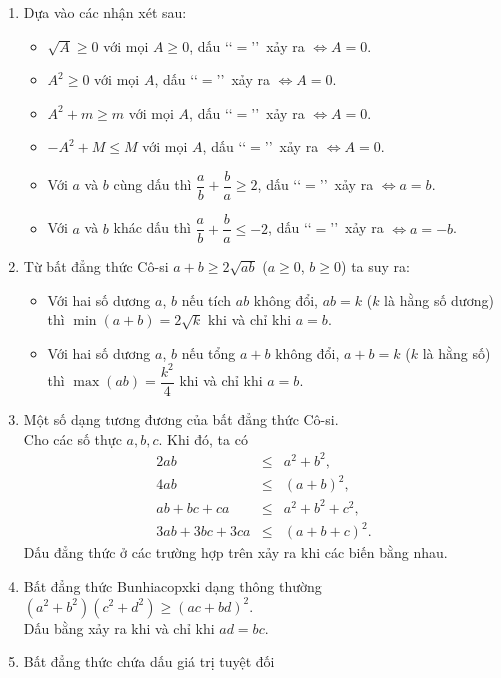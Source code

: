 \begin{enumerate}
	\item Dựa vào các nhận xét sau:
	\begin{itemize}
		\item $\sqrt{A}\geq 0$ với mọi $A\geq 0$,  dấu \lq\lq$=$\rq\rq\ xảy ra $\Leftrightarrow A=0$.
		\item $A^2\geq 0$ với mọi $A$, dấu \lq\lq$=$\rq\rq\ xảy ra $\Leftrightarrow A=0$.
		\item $A^2+m\geq m$ với mọi $A$, dấu \lq\lq$=$\rq\rq\ xảy ra $\Leftrightarrow A=0$. 
		\item $-A^2+M\leq M$ với mọi $A$, dấu \lq\lq$=$\rq\rq\ xảy ra $\Leftrightarrow A=0$.
		\item Với $a$ và $b$ cùng dấu thì $\dfrac{a}{b}+\dfrac{b}{a}\geq 2$, dấu \lq\lq$=$\rq\rq\ xảy ra $\Leftrightarrow a=b$. 
		\item Với $a$ và $b$ khác dấu thì $\dfrac{a}{b}+\dfrac{b}{a}\leq -2$, dấu \lq\lq$=$\rq\rq\ xảy ra $\Leftrightarrow a=-b$.
	\end{itemize}
	\item Từ bất đẳng thức Cô-si $a+b\geq 2\sqrt{ab}$ ($a\geq 0$, $b\geq 0$) ta suy ra:
	\begin{itemize}
		\item Với hai số dương $a$, $b$ nếu tích $ab$ không đổi, $ab=k$ ($k$ là hằng số dương) thì $\min (a+b)=2\sqrt{k}$ khi và chỉ khi $a=b$.
		\item Với hai số dương $a$, $b$ nếu tổng $a+b$ không đổi, $a+b=k$ ($k$ là hằng số) thì $\max (ab)=\dfrac{k^2}{4}$ khi và chỉ khi $a=b$.
	\end{itemize}
    \item Một số dạng tương đương của bất đẳng thức Cô-si.
    \\ Cho các số thực $a,b,c$. Khi đó, ta có
    {\allowdisplaybreaks 
    	\begin{eqnarray*}
    		2ab & \leq & a^2+b^2, \\
    		4ab &\leq& \left( a+b \right)^2, \\
    		ab + bc +ca &\leq & a^2 +b^2+c^2, \\
    		3ab + 3bc +3ca &\leq & (a+b+c)^2.
    \end{eqnarray*}}
    Dấu đẳng thức ở các trường hợp trên xảy ra khi các biến bằng nhau.
	\item Bất đẳng thức Bunhiacopxki dạng thông thường
	$(a^2 + b^2)(c^2 + d^2) \geq (ac + bd)^2$.\\
	Dấu bằng xảy ra khi và chỉ khi $ad=bc$.
	\item Bất đẳng thức chứa dấu giá trị tuyệt đối

\end{enumerate}
